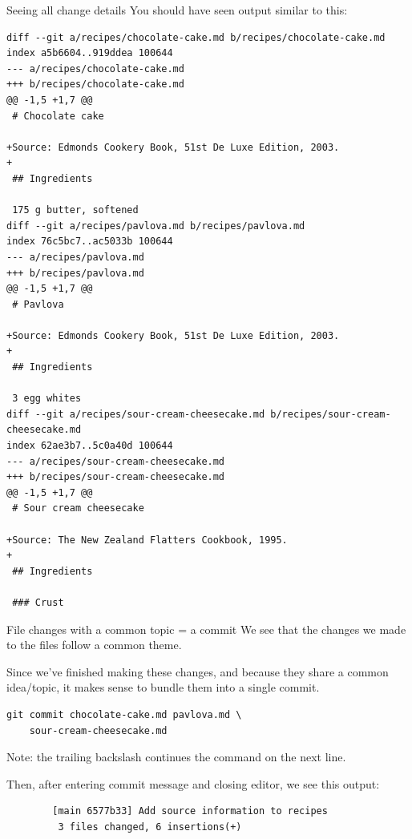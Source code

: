 \begin{frame}[fragile]{Seeing all change details}
    You should have seen output similar to this:
    \begin{verbatim}
diff --git a/recipes/chocolate-cake.md b/recipes/chocolate-cake.md
index a5b6604..919ddea 100644
--- a/recipes/chocolate-cake.md
+++ b/recipes/chocolate-cake.md
@@ -1,5 +1,7 @@
 # Chocolate cake

+Source: Edmonds Cookery Book, 51st De Luxe Edition, 2003.
+
 ## Ingredients

 175 g butter, softened
diff --git a/recipes/pavlova.md b/recipes/pavlova.md
index 76c5bc7..ac5033b 100644
--- a/recipes/pavlova.md
+++ b/recipes/pavlova.md
@@ -1,5 +1,7 @@
 # Pavlova

+Source: Edmonds Cookery Book, 51st De Luxe Edition, 2003.
+
 ## Ingredients

 3 egg whites
diff --git a/recipes/sour-cream-cheesecake.md b/recipes/sour-cream-cheesecake.md
index 62ae3b7..5c0a40d 100644
--- a/recipes/sour-cream-cheesecake.md
+++ b/recipes/sour-cream-cheesecake.md
@@ -1,5 +1,7 @@
 # Sour cream cheesecake

+Source: The New Zealand Flatters Cookbook, 1995.
+
 ## Ingredients

 ### Crust
    \end{verbatim}
\end{frame}

\begin{frame}[fragile]{File changes with a common topic = a commit}
    We see that the changes we made to the files follow a common theme.

    Since we've finished making these changes, and because they share a
    common idea/topic, it makes sense to bundle them into a single commit.

    \begin{verbatim}
git commit chocolate-cake.md pavlova.md \
    sour-cream-cheesecake.md
    \end{verbatim}
    Note: the trailing backslash continues the command on the next line.

    Then, after entering commit message and closing editor, we see this
    output:
    \begin{verbatim}
        [main 6577b33] Add source information to recipes
         3 files changed, 6 insertions(+)
    \end{verbatim}
\end{frame}

